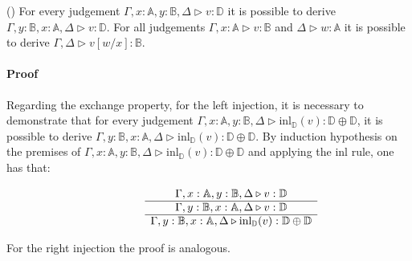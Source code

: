 \begin{lemma} \label {exh_and_sub} () For every judgement $\Gamma,x:\mathbb{A}, y:\mathbb{B}, \Delta \triangleright v: \mathbb{D}$ it is possible to derive $\Gamma, y:\mathbb{B}, x:\mathbb{A}, \Delta \triangleright v: \mathbb{D}$. For all judgements  $\Gamma,x:\mathbb{A} \triangleright v: \mathbb{B}$ and $\Delta \triangleright w: \mathbb{A}$ it is possible to derive $ \Gamma, \Delta \triangleright v[w/x]: \mathbb{B}$.
\end{lemma}

\paragraph{Proof}

Regarding the exchange property, for the left injection, it is necessary to demonstrate that for every judgement $\Gamma , x:\mathbb{A}, y:\mathbb{B},\Delta\triangleright \text{inl}_{\mathbb{D}}(v):  \mathbb{D} \oplus \mathbb{D}$, it is possible to derive $\Gamma ,y:\mathbb{B}, x:\mathbb{A}, \Delta \triangleright \text{inl}_{\mathbb{D}}(v):  \mathbb{D} \oplus \mathbb{D}$. By induction hypothesis on the premises of $\Gamma , x:\mathbb{A}, y:\mathbb{B},\Delta\triangleright \text{inl}_{\mathbb{D}}(v):  \mathbb{D} \oplus \mathbb{D}$ and applying the inl rule, one has that:

\begin{figure} [H]
  \begin{equation*}
  \begin{split}
  \begin{aligned}
  &
  \begin{minipage}[t]{0.3\textwidth}
  $\begin{array}{c}
    \Gamma, x:\mathbb{A}, y:\mathbb{B}, \Delta \triangleright v: \mathbb{D}  \\  
      \hline
      \Gamma,y:\mathbb{B}, x:\mathbb{A},  \Delta \triangleright v: \mathbb{D}  \\   
      \hline
       \Gamma, y:\mathbb{B}, x:\mathbb{A}, \Delta \triangleright \text{inl}_{\mathbb{D}}(v):  \mathbb{D} \oplus \mathbb{D}  
  \end{array}
  $
  \end{minipage}
  \end{aligned}
  \end{split}
  \end{equation*}
  \end{figure}

  For the right injection the proof is analogous.

